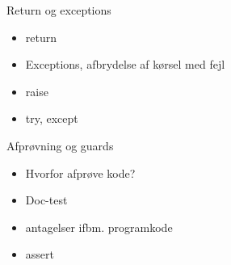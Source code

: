 \documentclass[a4paper,landscape]{slides}
\begin{document}
\begin{slide}
	\begin{center} {\large 
            Return og exceptions
	} \end{center}
	\begin{itemize} \addtolength{\itemsep}{-\baselineskip}
		\item return
		\item Exceptions, afbrydelse af kørsel med fejl
                \item raise
		\item try, except
	\end{itemize}
\end{slide}


\begin{slide}
	\begin{center} {\large 
            Afprøvning og guards
	} \end{center}
	\begin{itemize} \addtolength{\itemsep}{-\baselineskip}
                \item Hvorfor afprøve kode?
                \item Doc-test
                \item antagelser ifbm. programkode
                \item assert
	\end{itemize}
\end{slide}
\end{document}
